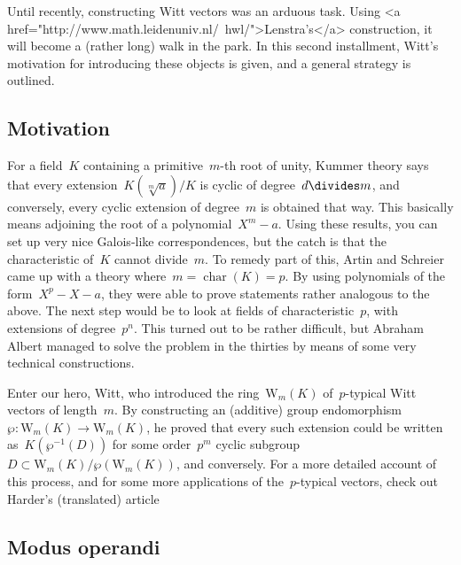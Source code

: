 Until recently, constructing Witt vectors was an arduous task. Using <a href="http://www.math.leidenuniv.nl/~hwl/">Lenstra's</a> construction, it will become a (rather long) walk in the park. In this second installment, Witt's motivation for introducing these objects is given, and a general strategy is outlined.

\subsection{Motivation}

For a field~$K$ containing a primitive~$m$-th root of unity, Kummer theory says that every extension~$K(\sqrt[m]a)/K$ is cyclic of degree~$d\divides m$, and conversely, every cyclic extension of degree~$m$ is obtained that way. This basically means adjoining the root of a polynomial~$X^{m}-a$. Using these results, you can set up very nice Galois-like correspondences, but the catch is that the characteristic of~$K$ cannot divide~$m$. To remedy part of this, Artin and Schreier came up with a theory where~$m = \operatorname{char}(K) = p$. By using polynomials of the form~$X^{p}-X-a$, they were able to prove statements rather analogous to the above. The next step would be to look at fields of characteristic~$p$, with extensions of degree~$p^{n}$. This turned out to be rather difficult, but Abraham Albert managed to solve the problem in the thirties by means of some very technical constructions.

Enter our hero, Witt, who introduced the ring~$\mathrm{W}_{m}(K)$ of~$p$-typical Witt vectors of length~$m$. By constructing an (additive) group endomorphism~$\wp\colon\mathrm{W}_{m}(K)\to\mathrm{W}_{m}(K)$, he proved that every such extension could be written as~$K(\wp^{−1}(D))$ for some order~$p^{m}$ cyclic subgroup~$D\subset\mathrm{W}_{m}(K)/\wp(\mathrm{W}_{m}(K))$, and conversely. For a more detailed account of this process, and for some more applications of the~$p$-typical vectors, check out Harder’s (translated) article %

\subsection{Modus operandi}

